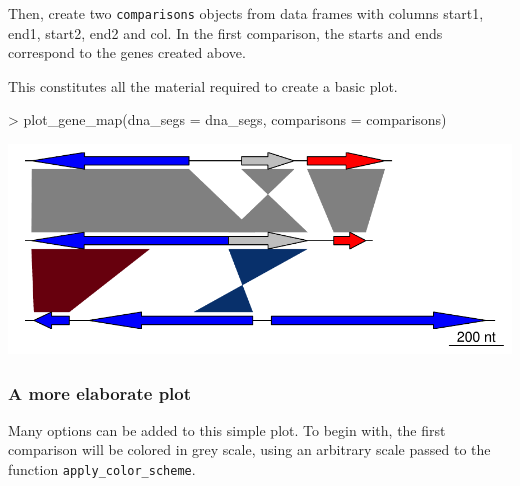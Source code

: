 \documentclass[a4paper]{article}
\newcommand{\code}[1]{\texttt{#1}}
\begin{document}
Then, create two \code{comparisons} objects from data frames with columns
start1, end1, start2, end2 and col. In the first comparison, the starts
and ends correspond to the genes created above.

\begin{Schunk}
\end{Schunk}

This constitutes all the material required to create a basic plot.

\begin{Schunk}
\begin{Sinput}
> plot_gene_map(dna_segs = dna_segs, comparisons = comparisons)
\end{Sinput}
\end{Schunk}
\begin{center}
\includegraphics{genoPlotR-016}
\end{center}
  
\subsubsection{A more elaborate plot}

Many options can be added to this simple plot. To begin with, the first 
comparison will be colored in grey scale, using an arbitrary scale passed 
to the function \code{apply\_color\_scheme}.

\begin{Schunk}
\end{Schunk}
\end{document}
